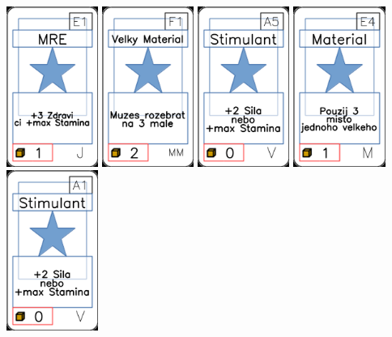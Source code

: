 \documentclass[a4paper]{article}
\begin{document}
	\includegraphics[width=3.0cm]{img-1_20}
	\includegraphics[width=3.0cm]{img-1_55}
	\includegraphics[width=3.0cm]{img-1_64}
	\includegraphics[width=3.0cm]{img-1_53}
	\includegraphics[width=3.0cm]{img-1_60}
\end{document}
